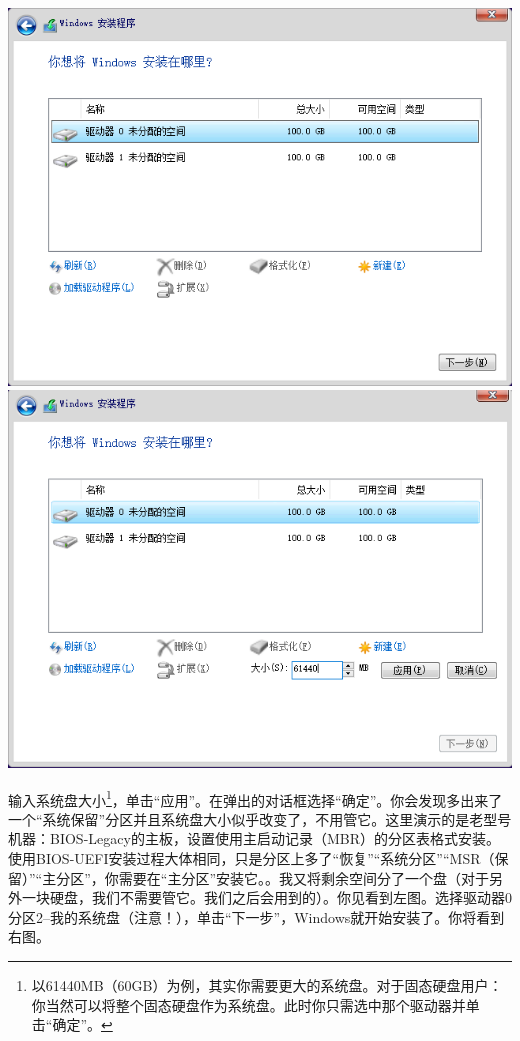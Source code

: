 \begin{center}
	\includegraphics[scale=0.22]{pic/win10setup4}	\includegraphics[scale=0.22]{pic/win10setup5}
\end{center} \par
输入系统盘大小\footnote{以61440MB（60GB）为例，其实你需要更大的系统盘。对于固态硬盘用户：你当然可以将整个固态硬盘作为系统盘。此时你只需选中那个驱动器并单击“确定”。}，单击“应用”。在弹出的对话框选择“确定”。你会发现多出来了一个“系统保留”分区并且系统盘大小似乎改变了，不用管它。{\color{red}这里演示的是老型号机器：BIOS-Legacy的主板，设置使用主启动记录（MBR）的分区表格式安装。使用BIOS-UEFI安装过程大体相同，只是分区上多了“恢复”“系统分区”“MSR（保留）”“主分区”，你需要在“主分区”安装它。}。我又将剩余空间分了一个盘（对于另外一块硬盘，我们不需要管它。我们之后会用到的）。你见看到左图。选择驱动器0分区2--我的系统盘{\color{red}（注意！）}，单击“下一步”，Windows就开始安装了。你将看到右图。
